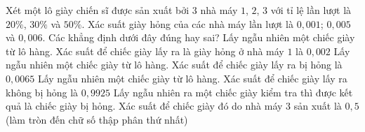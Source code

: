 \begin{ex}%
Xét một lô giày chiến sĩ được sản xuất bởi $3$ nhà máy $1$, $2$, $3$ với tỉ lệ lần lượt là $20\%$, $30\%$ và $50\%$. Xác suất giày hỏng của các nhà máy lần lượt là $0,001$; $0,005$ và $0,006$. Các khẳng định dưới đây đúng hay sai?
\choiceTF
	{\True Lấy ngẫu nhiên một chiếc giày từ lô hàng. Xác suất để chiếc giày lấy ra là giày hỏng ở nhà máy $1$ là $0,002$ }
	{\True Lấy ngẫu nhiên một chiếc giày từ lô hàng. Xác suất để chiếc giày lấy ra bị hỏng là $0,0065$}
	{Lấy ngẫu nhiên một chiếc giày từ lô hàng. Xác suất để chiếc giày lấy ra không bị hỏng là $0,9925$}
	{Lấy ngẫu nhiên ra một chiếc giày kiểm tra thì được kết quả là chiếc giày bị hỏng. Xác suất để chiếc giày đó do nhà máy $3$ sản xuất là $0,5$ (làm tròn đến chữ số thập phân thứ nhất)}
\end{ex}

